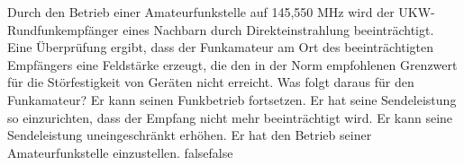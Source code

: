     {Durch den Betrieb einer Amateurfunkstelle auf 145,550 MHz wird der UKW-Rundfunkempfänger eines Nachbarn durch Direkteinstrahlung beeinträchtigt. Eine Überprüfung ergibt, dass der Funkamateur am Ort des beeinträchtigten Empfängers eine Feldstärke erzeugt, die den in der Norm empfohlenen Grenzwert für die Störfestigkeit von Geräten nicht erreicht. Was folgt daraus für den Funkamateur?}
    {Er kann seinen Funkbetrieb fortsetzen.}
    {Er hat seine Sendeleistung so einzurichten, dass der Empfang nicht mehr beeinträchtigt wird.}
    {Er kann seine Sendeleistung uneingeschränkt erhöhen.}
    {Er hat den Betrieb seiner Amateurfunkstelle einzustellen.}
    {false}{false}